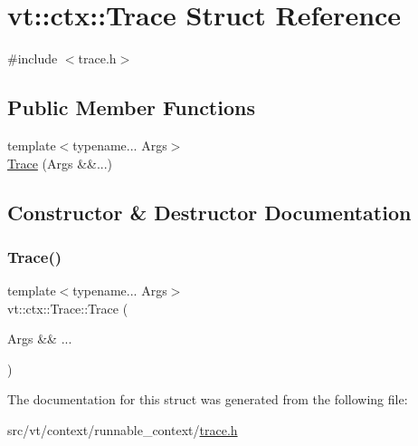 \hypertarget{structvt_1_1ctx_1_1_trace}{}\section{vt\+:\+:ctx\+:\+:Trace Struct Reference}
\label{structvt_1_1ctx_1_1_trace}


{\ttfamily \#include $<$trace.\+h$>$}

\subsection*{Public Member Functions}
\begin{DoxyCompactItemize}
\item 
{\footnotesize template$<$typename... Args$>$ }\\\hyperlink{structvt_1_1ctx_1_1_trace_ac499ebe5e3f5cd8622fee973ad48cbdf}{Trace} (Args \&\&...)
\end{DoxyCompactItemize}


\subsection{Constructor \& Destructor Documentation}
\mbox{\label{structvt_1_1ctx_1_1_trace_ac499ebe5e3f5cd8622fee973ad48cbdf}} 
\subsubsection{\texorpdfstring{Trace()}{Trace()}}
{\footnotesize\ttfamily template$<$typename... Args$>$ \\
vt\+::ctx\+::\+Trace\+::\+Trace (\begin{DoxyParamCaption}\item[{Args \&\&}]{... }\end{DoxyParamCaption})\hspace{0.3cm}{\ttfamily [inline]}}



The documentation for this struct was generated from the following file\+:\begin{DoxyCompactItemize}
\item 
src/vt/context/runnable\+\_\+context/\hyperlink{context_2runnable__context_2trace_8h}{trace.\+h}\end{DoxyCompactItemize}
